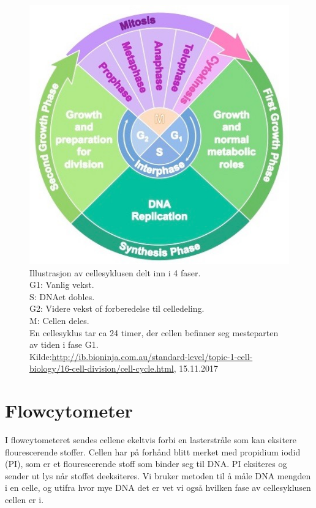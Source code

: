 \documentclass[a4paper, 12pt]{article}
\begin{document}
\begin{figure}[H]
\centering\includegraphics[scale=.8]{cellelab.jpg}
\caption{Illustrasjon av cellesyklusen delt inn i 4 faser.\\ G1: Vanlig vekst. \\S: DNAet dobles.\\ G2: Videre vekst of forberedelse til celledeling.\\ M: Cellen deles.\\
En cellesyklus tar ca 24 timer, der cellen befinner seg mesteparten av tiden i fase G1.\\
Kilde:\url{http://ib.bioninja.com.au/standard-level/topic-1-cell-biology/16-cell-division/cell-cycle.html}, 15.11.2017}
\end{figure}


\section{Flowcytometer}
I flowcytometeret sendes cellene ekeltvis forbi en lasterstråle som kan eksitere flourescerende stoffer. Cellen har på forhånd blitt merket med propidium iodid (PI), som er et flourescerende stoff som binder seg til DNA. PI eksiteres og sender ut lys når stoffet deeksiteres. Vi bruker metoden til å måle DNA mengden i en celle, og utifra hvor mye DNA det er vet vi også hvilken fase av cellesyklusen cellen er i.
\end{document}
